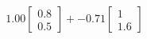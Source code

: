 \documentclass[preview]{standalone}
\begin{document}
\begin{align*}
1.00 \begin{bmatrix} 0.8 \\ 0.5 \end{bmatrix} + -0.71 \begin{bmatrix} 1 \\ 1.6 \end{bmatrix}
\end{align*}
\end{document}

